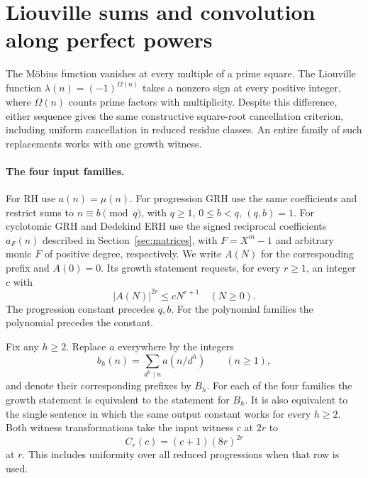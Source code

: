 \section{Liouville sums and convolution along perfect powers}\label{sec:powerdivisor}
The Möbius function vanishes at every multiple of a prime square. The Liouville function
$\lambda(n)=(-1)^{\Omega(n)}$ takes a nonzero sign at every positive integer, where
$\Omega(n)$ counts prime factors with multiplicity. Despite this difference, either sequence gives the same constructive square-root cancellation criterion, including uniform cancellation in reduced residue classes. An entire family of such replacements works with one growth witness.

\paragraph{The four input families.}
For RH use $a(n)=\mu(n)$. For progression GRH use the same coefficients and restrict sums to $n\equiv b\pmod q$, with $q\ge1$, $0\le b<q$, $(q,b)=1$. For cyclotomic GRH and Dedekind ERH use the signed reciprocal coefficients $a_F(n)$ described in Section~\ref{sec:matrices}, with $F=X^m-1$ and arbitrary monic $F$ of positive degree, respectively. We write $A(N)$ for the corresponding prefix and $A(0)=0$. Its growth statement requests, for every $r\ge1$, an integer $c$ with
\[
             |A(N)|^{2r}\le c N^{r+1}\quad(N\ge0).
\]
The progression constant precedes $q,b$. For the polynomial families the polynomial precedes the constant.

\begin{theorem}\label{thm:powerdivisor}
Fix any $h\ge2$. Replace $a$ everywhere by the integers
\[
   b_h(n)=\sum_{d^h\mid n}a(n/d^h)\qquad(n\ge1),
\]
and denote their corresponding prefixes by $B_h$. For each of the four families the growth statement is equivalent to the statement for $B_h$. It is also equivalent to the single sentence in which the same output constant works for every $h\ge2$. Both witness transformations take the input witness $c$ at $2r$ to
\[
                       C_r(c)=(c+1)(8r)^{2r}
\]
at $r$. This includes uniformity over all reduced progressions when that row is used.
\end{theorem}

